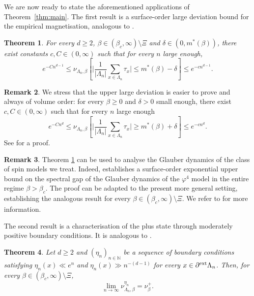 \documentclass[11pt,a4paper]{article}
\numberwithin{equation}{section}
\theoremstyle{plain}
\newtheorem{Thm}{Theorem}[section]
\theoremstyle{definition}
\newtheorem{Rem}[Thm]{Remark}
\begin{document}
We are now ready to state the aforementioned applications of Theorem~\ref{thm:main}. The  first result is a surface-order large deviation bound for the empirical magnetisation, analogous to \cite[Theorem~1.1]{gunaratnam2025supercritical}.


\begin{Thm}\label{thm:ldp free}
	For every $d\geq2$, $\beta \in (\beta_c,\infty)\setminus\Xi$ and $\delta\in(0,m^*(\beta) )$, there exist constants $c,C\in(0,\infty)$ such that for every $n$ large enough,
	\begin{equation}\label{eq:ldp surface}
		e^{-Cn^{d-1}}\leq \nu_{\Lambda_n,\beta}\left[ \Big|\frac{1}{|\Lambda_n |} \sum_{x\in\Lambda_n} \tau_x \Big| \leq m^*(\beta)-\delta\right]\leq e^{-cn^{d-1}}.
	\end{equation}
\end{Thm}

\begin{Rem}\label{rem: vol order}
	We stress that the upper large deviation is easier to prove and always of volume order: for every $\beta\geq0$ and $\delta>0$ small enough, there exist $c,C\in(0,\infty)$ such that for every $n$ large enough
	\begin{equation}\label{eq:ldp volume}
		e^{-Cn^d}\leq \nu_{\Lambda_n,\beta}\left[ \Big|\frac{1}{|\Lambda_n |} \sum_{x\in\Lambda_n} \tau_x \Big|  \geq m^*(\beta)+\delta \right]\leq e^{-cn^d}.
	\end{equation}
	See \cite[Section 7]{gunaratnam2025supercritical} for a proof. 
\end{Rem}

\begin{Rem} Theorem \ref{thm:ldp free} can be used to analyse the Glauber dynamics of the class of spin models we treat. Indeed, \cite{gunaratnam2025supercritical} establishes a surface-order exponential upper bound on the 
spectral gap of the Glauber dynamics of the $\varphi^4$ model in the entire regime $\beta>\beta_c$. The proof can be adapted to the present more 
general setting, establishing the analogous result for every 
$\beta\in(\beta_c,\infty)\setminus\Xi$. We refer to \cite[Section~8]{gunaratnam2025supercritical} for more information.
\end{Rem}
The second result is a characterisation of the plus state through moderately positive boundary conditions. It is analogous to \cite[Proposition~B.2]{gunaratnam2025supercritical}. 

\begin{Thm}\label{thm: weak plus measure}
	Let $d\geq2$ and $(\eta_n)_{n\in\mathbb N}$ be a sequence of boundary conditions satisfying $\eta_n(x)\ll e^{n}$ and $\eta_n(x) \gg n^{-(d-1)}$ for every $x\in \partial^{\textup{ext}}\Lambda_n$. Then, for every $\beta\in (\beta_c,\infty)\setminus\Xi$,
	\begin{equation}\label{eq:weak plus equal plus}
		\lim_{n\to\infty} \nu^{\eta_n}_{\Lambda_n,\beta} = \nu^+_{\beta}.    
	\end{equation}
\end{Thm}
\end{document}

